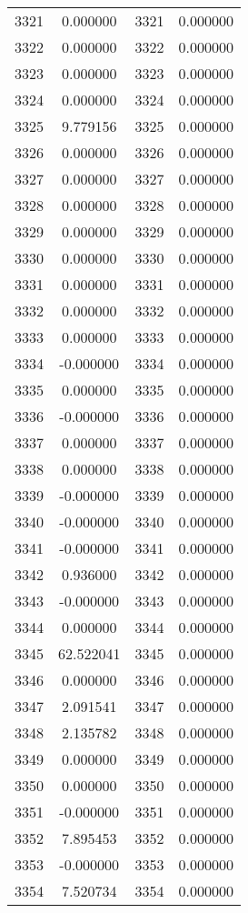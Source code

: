 \documentclass[12pt]{article}
\begin{document}
\begin{longtable}{@{}cccc@{}}
3321 & 0.000000 & 3321 & 0.000000 \\
3322 & 0.000000 & 3322 & 0.000000 \\
3323 & 0.000000 & 3323 & 0.000000 \\
3324 & 0.000000 & 3324 & 0.000000 \\
3325 & 9.779156 & 3325 & 0.000000 \\
3326 & 0.000000 & 3326 & 0.000000 \\
3327 & 0.000000 & 3327 & 0.000000 \\
3328 & 0.000000 & 3328 & 0.000000 \\
3329 & 0.000000 & 3329 & 0.000000 \\
3330 & 0.000000 & 3330 & 0.000000 \\
3331 & 0.000000 & 3331 & 0.000000 \\
3332 & 0.000000 & 3332 & 0.000000 \\
3333 & 0.000000 & 3333 & 0.000000 \\
3334 & -0.000000 & 3334 & 0.000000 \\
3335 & 0.000000 & 3335 & 0.000000 \\
3336 & -0.000000 & 3336 & 0.000000 \\
3337 & 0.000000 & 3337 & 0.000000 \\
3338 & 0.000000 & 3338 & 0.000000 \\
3339 & -0.000000 & 3339 & 0.000000 \\
3340 & -0.000000 & 3340 & 0.000000 \\
3341 & -0.000000 & 3341 & 0.000000 \\
3342 & 0.936000 & 3342 & 0.000000 \\
3343 & -0.000000 & 3343 & 0.000000 \\
3344 & 0.000000 & 3344 & 0.000000 \\
3345 & 62.522041 & 3345 & 0.000000 \\
3346 & 0.000000 & 3346 & 0.000000 \\
3347 & 2.091541 & 3347 & 0.000000 \\
3348 & 2.135782 & 3348 & 0.000000 \\
3349 & 0.000000 & 3349 & 0.000000 \\
3350 & 0.000000 & 3350 & 0.000000 \\
3351 & -0.000000 & 3351 & 0.000000 \\
3352 & 7.895453 & 3352 & 0.000000 \\
3353 & -0.000000 & 3353 & 0.000000 \\
3354 & 7.520734 & 3354 & 0.000000 \\

\end{longtable}
\end{document}
